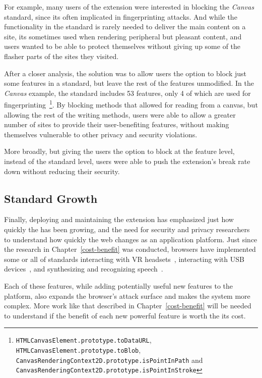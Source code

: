 For example, many users of the extension were interested in blocking the
\textit{Canvas} standard, since its often implicated in fingerprinting attacks.
And while the functionality in the standard is rarely needed to deliver the
main content on a site, its sometimes used when rendering peripheral but pleasant
content, and users wanted to be able to protect themselves without giving
up some of the flasher parts of the sites they visited.

After a closer analysis, the solution was to allow users the option to block
just some features in a standard, but leave the rest of the features
unmodified.  In the \textit{Canvas} example, the standard includes 53 features,
only 4 of which are used for fingerprinting~\footnote{%
\texttt{HTMLCanvasElement.prototype.toDataURL},
\texttt{HTMLCanvasElement.prototype.toBlob},
\texttt{CanvasRenderingContext2D.prototype.isPointInPath} and
\texttt{CanvasRenderingContext2D.prototype.isPointInStroke}}.  By blocking
methods that allowed for reading from a canvas, but allowing the rest of the
writing methods, users were able to allow a greater number of sites to provide
their user-benefiting features, without making themselves vulnerable to other
privacy and security violations.

More broadly, but giving the users the option to block at the feature level,
instead of the standard level, users were able to push the extension's break
rate down without reducing their security.


\subsection{\WAPI Standard Growth}
Finally, deploying and maintaining the extension has emphasized just how
quickly the \WAPI has been growing, and the need for security and privacy
researchers to understand how quickly the web changes as an application
platform.  Just since the research in Chapter~\ref{cost-benefit} was conducted,
browsers have implemented some or all of standards interacting with VR
headsets~\cite{webvrstandard}, interacting with USB
devices~\cite{webusbstandard}, and synthesizing and recognizing
speech~\cite{speechtandard}.

Each of these features, while adding
potentially useful new features to the platform, also expands the browser's
attack surface and makes the system more complex.  More work like that
described in Chapter~\ref{cost-benefit} will be needed to understand if
the benefit of each new powerful feature is worth the its cost.
